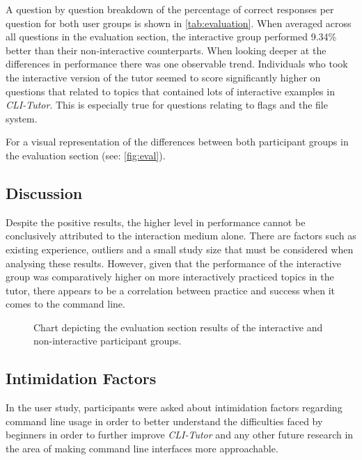 A question by question breakdown of the percentage of correct responses per
question for both user groups is shown in \autoref{tab:evaluation}. When
averaged across all questions in the evaluation section, the interactive group
performed 9.34\% better than their non-interactive counterparts. When looking
deeper at the differences in performance there was one observable trend.
Individuals who took the interactive version of the tutor seemed to score
significantly higher on questions that related to topics that contained lots of
interactive examples in \textit{CLI-Tutor}. This is especially true for
questions relating to flags and the file system.

For a visual representation of the differences between both participant groups
in the evaluation section (see: \autoref{fig:eval}).

\subsection{Discussion}

Despite the positive results, the higher level in performance cannot be
conclusively attributed to the interaction medium alone. There are factors such
as existing experience, outliers and a small study size that must be considered
when analysing these results. However, given that the performance of the
interactive group was comparatively higher on more interactively practiced
topics in the tutor, there appears to be a correlation between practice and
success when it comes to the command line.



\begin{figure}[htbp]
	\centering
	\scalebox{0.67}{}
	\caption{Chart depicting the evaluation section results of the interactive and non-interactive participant groups.}
	\label{fig:eval}
\end{figure}

\FloatBarrier %

\subsection{Intimidation Factors}

In the user study, participants were asked about intimidation factors regarding
command line usage in order to better understand the difficulties faced by
beginners in order to further improve \textit{CLI-Tutor} and any other future
research in the area of making command line interfaces more approachable.


